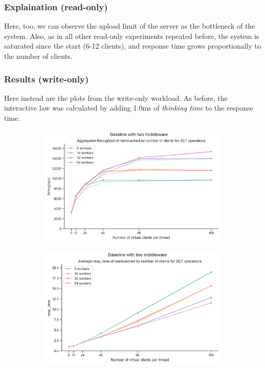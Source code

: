 \documentclass[11pt,a4paper]{article}
\begin{document}
\subsubsection{Explaination (read-only)}

Here, too, we can observe the upload limit of the server as the bottleneck of the system. 
Also, as in all other read-only experiments repeated before, the system is saturated since the start (6-12 clients), 
and response time grows proportionally to the number of clients.


\subsubsection{Results (write-only)}

Here instead are the plots from the write-only workload.
As before, the interactive law was calculated by adding 1.0ms of \emph{thinking time} to the response time.

\begin{figure}[H]
	\begin{subfigure}[b]{0.5\linewidth}
		\includegraphics[width=\linewidth]{images/middleware_2/last_graph_set_throughput.pdf}
	\end{subfigure}
	\begin{subfigure}[b]{0.5\linewidth}
		\includegraphics[width=\linewidth]{images/middleware_2/last_graph_set_resp_time.pdf}
	\end{subfigure}
	\caption{}
	\label{fig:madonna}
\end{figure}
\end{document}

